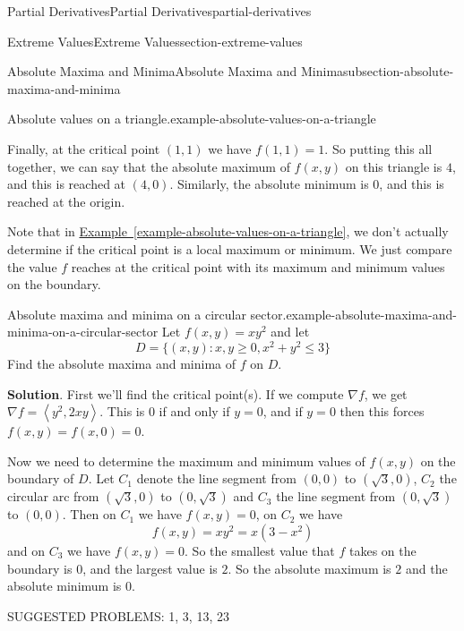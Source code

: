 \documentclass[oneside,10pt,]{book}
\numberwithin{equation}{section}
\newcommand{\grad}{\nabla}
\newcommand{\dotprod}[1]{\left\langle #1 \right\rangle}
\begin{document}
\begin{chapterptx}{Partial Derivatives}{}{Partial Derivatives}{}{}{partial-derivatives}
\begin{sectionptx}{Extreme Values}{}{Extreme Values}{}{}{section-extreme-values}
\begin{subsectionptx}{Absolute Maxima and Minima}{}{Absolute Maxima and Minima}{}{}{subsection-absolute-maxima-and-minima}
\begin{example}{Absolute values on a triangle.}{example-absolute-values-on-a-triangle}
\begin{table}
\end{table}
\hypertarget{p-1438}{}%
Finally, at the critical point \((1,1)\) we have \(f(1,1) = 1\). So putting this all together, we can say that the absolute maximum of \(f(x,y)\) on this triangle is \(4\), and this is reached at \((4,0)\). Similarly, the absolute minimum is \(0\), and this is reached at the origin.%
\end{example}
\hypertarget{p-1439}{}%
Note that in \hyperref[example-absolute-values-on-a-triangle]{Example~\ref{example-absolute-values-on-a-triangle}}, we don't actually determine if the critical point is a local maximum or minimum. We just compare the value \(f\) reaches at the critical point with its maximum and minimum values on the boundary.%
\begin{example}{Absolute maxima and minima on a circular sector.}{example-absolute-maxima-and-minima-on-a-circular-sector}%
\hypertarget{p-1440}{}%
Let \(f(x,y) = xy^{2}\) and let%
\begin{equation*}
D = \{(x,y) : x,y \geq 0, x^{2} + y^{2} \leq 3\}
\end{equation*}
Find the absolute maxima and minima of \(f\) on \(D\).%
\par\smallskip%
\noindent\textbf{Solution}.\hypertarget{solution-234}{}\quad%
\hypertarget{p-1441}{}%
First we'll find the critical point(s). If we compute \(\grad f\), we get \(\grad f = \dotprod{y^{2}, 2xy}\). This is \(0\) if and only if \(y=0\), and if \(y=0\) then this forces \(f(x,y) = f(x,0) = 0\).%
\par
\hypertarget{p-1442}{}%
Now we need to determine the maximum and minimum values of \(f(x,y)\) on the boundary of \(D\). Let \(C_{1}\) denote the line segment from \((0,0)\) to \((\sqrt{3},0)\), \(C_{2}\) the circular arc from \((\sqrt{3},0)\) to \((0,\sqrt{3})\) and \(C_{3}\) the line segment from \((0,\sqrt{3})\) to \((0,0)\). Then on \(C_{1}\) we have \(f(x,y) = 0\), on \(C_{2}\) we have%
\begin{equation*}
f(x,y) = xy^{2} = x(3-x^{2})
\end{equation*}
and on \(C_{3}\) we have \(f(x,y) = 0\). So the smallest value that \(f\) takes on the boundary is \(0\), and the largest value is \(2\). So the absolute maximum is \(2\) and the absolute minimum is \(0\).%
\end{example}
\end{subsectionptx}
\hypertarget{p-1443}{}%
SUGGESTED PROBLEMS: 1, 3, 13, 23%
\end{sectionptx}
%
%
\typeout{************************************************}

\end{chapterptx}
\end{document}
